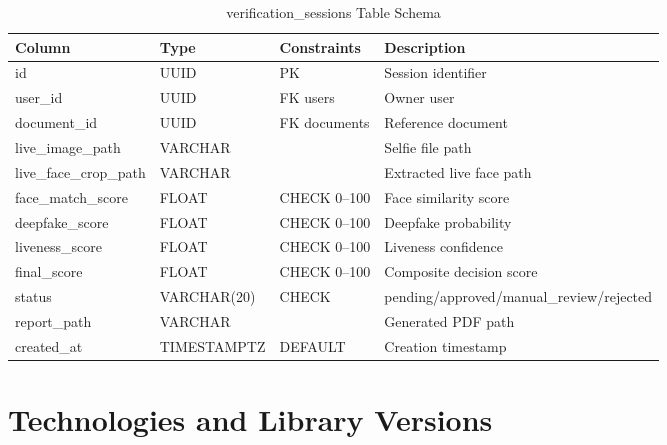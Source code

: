 \begin{table}[H]
\centering
\caption{verification\_sessions Table Schema}
\begin{tabular}{@{}llll@{}}
\toprule
\textbf{Column} & \textbf{Type} & \textbf{Constraints} & \textbf{Description} \\
\midrule
id & UUID & PK & Session identifier \\
user\_id & UUID & FK users & Owner user \\
document\_id & UUID & FK documents & Reference document \\
live\_image\_path & VARCHAR & & Selfie file path \\
live\_face\_crop\_path & VARCHAR & & Extracted live face path \\
face\_match\_score & FLOAT & CHECK 0--100 & Face similarity score \\
deepfake\_score & FLOAT & CHECK 0--100 & Deepfake probability \\
liveness\_score & FLOAT & CHECK 0--100 & Liveness confidence \\
final\_score & FLOAT & CHECK 0--100 & Composite decision score \\
status & VARCHAR(20) & CHECK & pending/approved/manual\_review/rejected \\
report\_path & VARCHAR & & Generated PDF path \\
created\_at & TIMESTAMPTZ & DEFAULT & Creation timestamp \\
\bottomrule
\end{tabular}
\end{table}

\chapter{Technologies and Library Versions}

